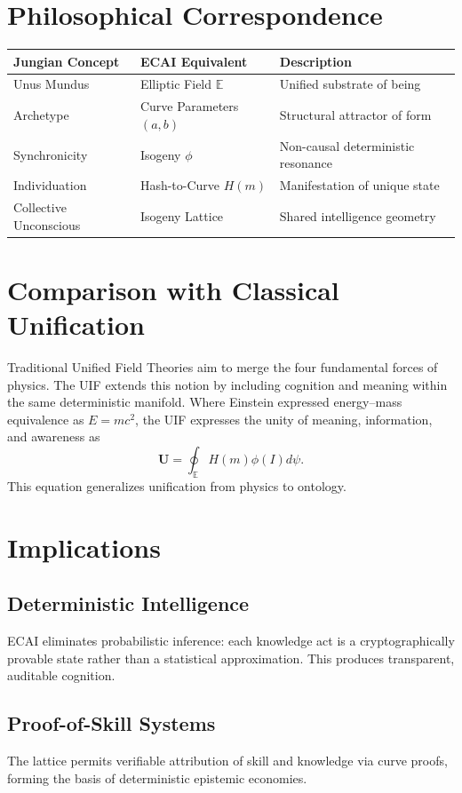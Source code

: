 \documentclass[12pt,a4paper]{article}
\begin{document}
\section{Philosophical Correspondence}
\begin{center}
\begin{tabular}{lll}
\hline
\textbf{Jungian Concept} & \textbf{ECAI Equivalent} & \textbf{Description} \\
\hline
Unus Mundus & Elliptic Field $\mathbb{E}$ & Unified substrate of being \\
Archetype & Curve Parameters $(a,b)$ & Structural attractor of form \\
Synchronicity & Isogeny $\phi$ & Non-causal deterministic resonance \\
Individuation & Hash-to-Curve $H(m)$ & Manifestation of unique state \\
Collective Unconscious & Isogeny Lattice & Shared intelligence geometry \\
\hline
\end{tabular}
\end{center}

\section{Comparison with Classical Unification}
Traditional Unified Field Theories aim to merge the four fundamental forces of physics.  
The UIF extends this notion by including cognition and meaning within the same deterministic manifold.  
Where Einstein expressed energy–mass equivalence as $E=mc^2$, the UIF expresses the unity of meaning, information, and awareness as
\[
\mathbf{U} = \oint_{\mathbb{E}} H(m)\phi(I)d\psi .
\]
This equation generalizes unification from physics to ontology.

\section{Implications}
\subsection{Deterministic Intelligence}
ECAI eliminates probabilistic inference: each knowledge act is a cryptographically provable state rather than a statistical approximation.  
This produces transparent, auditable cognition.

\subsection{Proof-of-Skill Systems}
The lattice permits verifiable attribution of skill and knowledge via curve proofs, forming the basis of deterministic epistemic economies.
\end{document}
